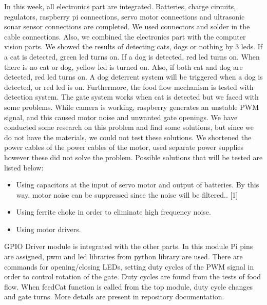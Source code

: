  In this week, all electronics part are integrated. Batteries, charge circuits, regulators, raspberry pi connections, servo motor connections and ultrasonic sonar sensor connections are completed. We used connectors and solder in the cable connections. Also, we combined the electronics part with the computer vision parts. We showed the results of detecting cats, dogs or nothing by 3 leds. If a cat is detected, green led turns on. If a dog is detected, red led turns on. When there is no cat or dog, yellow led is turned on. Also, if both cat and dog are detected, red led turns on. A dog deterrent system will be triggered when a dog is detected, or red led is on. Furthermore, the food flow mechanism is tested with detection system. The gate system works when cat is detected but we faced with some problems. While camera is working, raspberry generates an unstable PWM signal, and this caused motor noise and unwanted gate openings. We have conducted some research on this problem  and find some solutions, but since we do not have the materials, we could not test these solutions. We shortened the power cables of the power cables of the motor, used separate power supplies however these did not solve the problem. Possible solutions that will be tested are listed below: 
 
\begin{itemize}
\item Using capacitors at the input of servo motor and output of batteries. By this way, motor noise can be suppressed since the noise will be filtered.. [1]
\item Using ferrite choke in order to eliminate high frequency noise.
\item Using motor drivers.
\end{itemize}


GPIO Driver module is integrated with the other parts. In this module Pi pins are assigned, pwm and led libraries from python library are used. There are commands for opening/closing LEDs, setting duty cycles of the PWM signal in order to control rotation of the gate. Duty cycles are found from the tests of food flow. When feedCat function is called from the top module, duty cycle changes and gate turns. More details are present in repository documentation.


